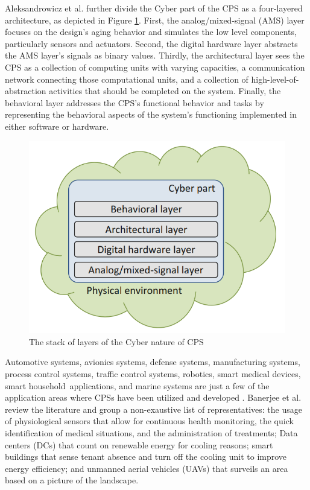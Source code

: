 Aleksandrowicz et al. \cite{aleksandrowicz2018designing} further divide the Cyber part of the CPS as a four-layered architecture, as depicted in Figure \ref{fig:cyber_cps}. First, the analog/mixed-signal (AMS) layer focuses on the design's aging behavior and simulates the low level components, particularly sensors and actuators. Second, the digital hardware layer abstracts the AMS layer's signals as binary values. Thirdly, the architectural layer sees the CPS as a collection of computing units with varying capacities, a communication network connecting those computational units, and a collection of high-level-of-abstraction activities that should be completed on the system. Finally, the behavioral layer addresses the CPS's functional behavior and tasks by representing the behavioral aspects of the system's functioning implemented in either software or hardware.

\begin{figure}[!htb]
	\centering
	\includegraphics[width=0.5\linewidth]{img/cyber_CPS.png}
	\caption{The stack of layers of the Cyber nature of CPS \cite{aleksandrowicz2018designing}}
   \label{fig:cyber_cps}
\end{figure}  

Automotive systems, avionics systems, defense systems, manufacturing systems, process control systems, traffic control systems, robotics, smart medical devices, smart household applications, and marine systems are just a few of the application areas where CPSs have been utilized and developed \cite{bolbot2019vulnerabilities}. Banerjee et al. \cite{banerjee2011ensuring} review the literature and group a non-exaustive list of representatives: the usage of physiological sensors that allow for continuous health monitoring, the quick identification of medical situations, and the administration of treatments; Data centers (DCs) that count on renewable energy for cooling reasons; smart buildings that sense tenant absence and turn off the cooling unit to improve energy efficiency; and unmanned aerial vehicles (UAVs) that surveils an area based on a picture of the landscape.


